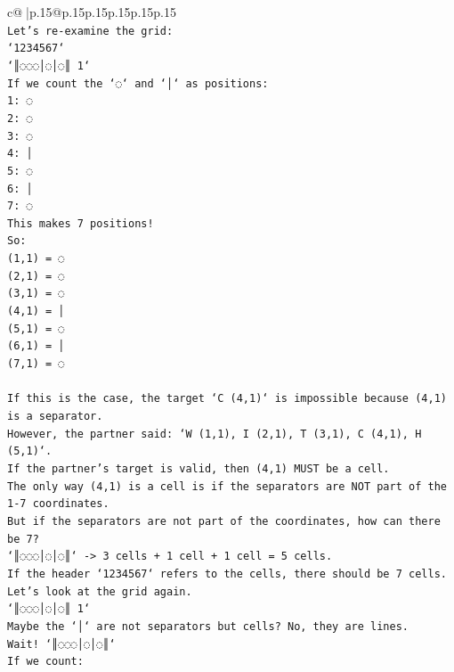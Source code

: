 \documentclass{article}
\begin{document}
{\begin{supertabular}{c@{$\;$}|p{.15\linewidth}@{}p{.15\linewidth}p{.15\linewidth}p{.15\linewidth}p{.15\linewidth}p{.15\linewidth}}
{{{\\ 
\texttt{Let's re{-}examine the grid:} \\
\texttt{`1234567`} \\
\texttt{`║◌◌◌│◌│◌║ 1`} \\
\texttt{If we count the `◌` and `│` as positions:} \\
\texttt{1: ◌} \\
\texttt{2: ◌} \\
\texttt{3: ◌} \\
\texttt{4: │} \\
\texttt{5: ◌} \\
\texttt{6: │} \\
\texttt{7: ◌} \\
\texttt{This makes 7 positions!} \\
\texttt{So:} \\
\texttt{(1,1) = ◌} \\
\texttt{(2,1) = ◌} \\
\texttt{(3,1) = ◌} \\
\texttt{(4,1) = │} \\
\texttt{(5,1) = ◌} \\
\texttt{(6,1) = │} \\
\texttt{(7,1) = ◌} \\
\\ 
\texttt{If this is the case, the target `C (4,1)` is impossible because (4,1) is a separator.} \\
\texttt{However, the partner said: `W (1,1), I (2,1), T (3,1), C (4,1), H (5,1)`.} \\
\texttt{If the partner's target is valid, then (4,1) MUST be a cell.} \\
\texttt{The only way (4,1) is a cell is if the separators are NOT part of the 1{-}7 coordinates.} \\
\texttt{But if the separators are not part of the coordinates, how can there be 7?} \\
\texttt{`║◌◌◌│◌│◌║` {-}> 3 cells + 1 cell + 1 cell = 5 cells.} \\
\texttt{If the header `1234567` refers to the cells, there should be 7 cells.} \\
\texttt{Let's look at the grid again.} \\
\texttt{`║◌◌◌│◌│◌║ 1`} \\
\texttt{Maybe the `│` are not separators but cells? No, they are lines.} \\
\texttt{Wait! `║◌◌◌│◌│◌║`} \\
\texttt{If we count:} \\
}}}
\end{supertabular}}
\end{document}

